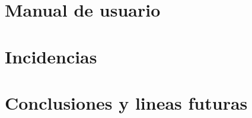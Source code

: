 \documentclass{memoriaPFC}
\begin{document}


\chapter{Manual de usuario}



\chapter{Incidencias}



\chapter{Conclusiones y lineas futuras}



\backmatter
\appendix


%

\end{document}
